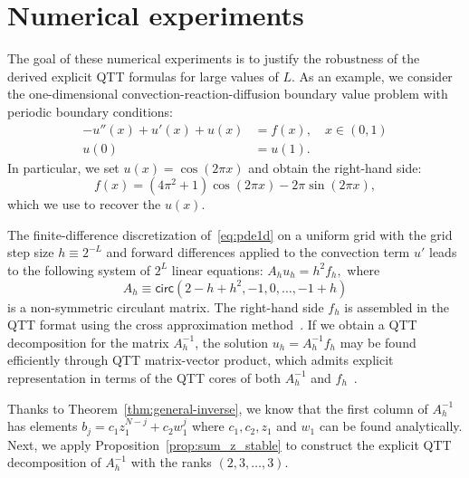 \documentclass[a4paper]{article}
\newcommand{\LL}{L}
\begin{document}
\section{Numerical experiments} \label{sec:num_exp}

The goal of these numerical experiments is to justify the robustness of the derived explicit QTT formulas for large values of $\LL$.
As an example, we consider the one-dimensional convection-reaction-diffusion boundary value problem with periodic boundary conditions:
\begin{equation}\label{eq:pde1d}
\begin{aligned}
    -u''(x) + u'(x) + u(x) &= f(x),\quad x\in (0,1) \\
    u(0) &= u(1).
\end{aligned}
\end{equation}
In particular, we set $u(x) = \cos (2\pi x)$ and obtain the right-hand side: \[f(x) = (4\pi^2+1) \cos (2\pi x) - 2\pi \sin (2\pi x),\]
which we use to recover the $u(x)$.

The finite-difference discretization of~\eqref{eq:pde1d} on a uniform grid with the grid step size $h \equiv 2^{-\LL}$ and forward differences applied to the convection term $u'$ leads to the following system of $2^L$ linear equations: 
$
A_h u_h = h^2 f_h,
$
where
\[
A_h \equiv \mathsf{circ}(2-h+h^2, -1, 0, \dots, -1+h)
\]
is a non-symmetric circulant matrix.
The right-hand side $f_h$ is assembled in the QTT format using the cross approximation method~\cite{ot-ttcross-2010}.
If we obtain a QTT decomposition for the matrix $A_h^{-1}$, the solution $u_h = A_h^{-1} f_h$ may be found efficiently through QTT matrix-vector product, which admits explicit representation in terms of the QTT cores of both $A_h^{-1}$ and $f_h$~\cite{osel-tt-2011}.

Thanks to Theorem~\ref{thm:general-inverse}, we know that the first column of $A_h^{-1}$ has elements $b_j = c_1z_1^{N-j} + c_2w_1^{j}$ where $c_1, c_2, z_1$ and $w_1$ can be found analytically.
Next, we apply Proposition~\ref{prop:sum_z_stable} to construct the explicit QTT decomposition of $A_h^{-1}$ with the ranks $(2,3,\dots,3)$.

\end{document}
